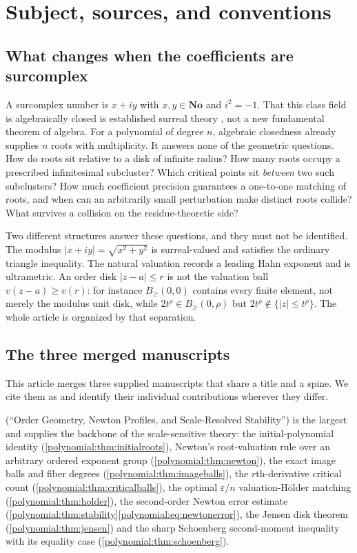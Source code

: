 \documentclass[11pt,letterpaper]{article}
\numberwithin{equation}{section}
\theoremstyle{definition}
\theoremstyle{remark}\newtheorem{remark}[theorem]{Remark}
\newcommand{\No}{\mathbf{No}}
\newcommand{\Bge}[2]{B_{\ge}(#1,#2)}
\begin{document}
\section{Subject, sources, and conventions}\label{polynomial:sec:intro}

\subsection{What changes when the coefficients are surcomplex}
A surcomplex number is $x+iy$ with $x,y\in\No$ and $i^2=-1$. That this class
field is algebraically closed is established surreal theory
\cite{polynomial:Conway,polynomial:Gonshor,polynomial:Poonen}, not a new
fundamental theorem of algebra. For a polynomial of degree $n$, algebraic
closedness already supplies $n$ roots with multiplicity. It answers none of
the geometric questions. How do roots sit relative to a disk of infinite
radius? How many roots occupy a prescribed infinitesimal subcluster? Which
critical points sit \emph{between} two such subclusters? How much coefficient
precision guarantees a one-to-one matching of roots, and when can an
arbitrarily small perturbation make distinct roots collide? What survives a
collision on the residue-theoretic side?

Two different structures answer these questions, and they must not be
identified. The modulus $|x+iy|=\sqrt{x^2+y^2}$ is surreal-valued and
satisfies the ordinary triangle inequality. The natural valuation records a
leading Hahn exponent and is ultrametric. An order disk $|z-a|\le r$ is not
the valuation ball $v(z-a)\ge v(r)$: for instance $\Bge00$ contains every
finite element, not merely the modulus unit disk, while $2t^\rho\in\Bge0\rho$
but $2t^\rho\notin\{|z|\le t^\rho\}$. The whole article is organized by that
separation.

\subsection{The three merged manuscripts}
This article merges three supplied manuscripts that share a title and a
spine. We cite them as
\cite{polynomial:MsFactorization,polynomial:MsNewton,polynomial:MsTrees} and
identify their individual contributions wherever they differ.

\cite{polynomial:MsNewton} (``Order Geometry, Newton Profiles, and
Scale-Resolved Stability'') is the largest and supplies the backbone of the
scale-sensitive theory: the initial-polynomial identity
(\cref{polynomial:thm:initialroots}), Newton's root-valuation rule over an
arbitrary ordered exponent group (\cref{polynomial:thm:newton}), the exact
image balls and fiber degrees (\cref{polynomial:thm:imageballs}), the
$r$th-derivative critical count (\cref{polynomial:thm:criticalballs}), the
optimal $\varepsilon/n$ valuation-H\"older matching
(\cref{polynomial:thm:holder}), the second-order Newton error estimate
(\cref{polynomial:thm:stability}\eqref{polynomial:eq:newtonerror}), the
Jensen disk theorem (\cref{polynomial:thm:jensen}) and the sharp Schoenberg
second-moment inequality with its equality case
(\cref{polynomial:thm:schoenberg}).
\end{document}
